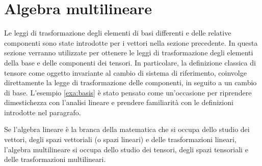 % 
%

\newpage \clearpage
\section{Algebra multilineare}
Le leggi di trasformazione degli elementi di basi differenti e delle relative componenti sono state introdotte per i vettori nella sezione precedente. In questa sezione verranno utilizzate per ottenere le leggi di trasformazione degli elementi della base e delle componenti dei tensori. In particolare, la definizione classica di tensore come oggetto invariante al cambio di sistema di riferimento, coinvolge direttamente la legge di trasformazione delle componenti, in seguito a un cambio di base. L'esempio \ref{exa:basis} è stato pensato come un'occasione per riprendere dimestichezza con l'analisi lineare e prendere familiarità con le definizioni introdotte nel paragrafo.

Se l'algebra lineare è la branca della matematica che si occupa dello studio dei vettori, degli spazi vettoriali (o spazi lineari) e delle trasformazioni lineari, l'algebra multilineare si occupa dello studio dei tensori, degli spazi tensoriali e delle trasformazioni multilineari.

